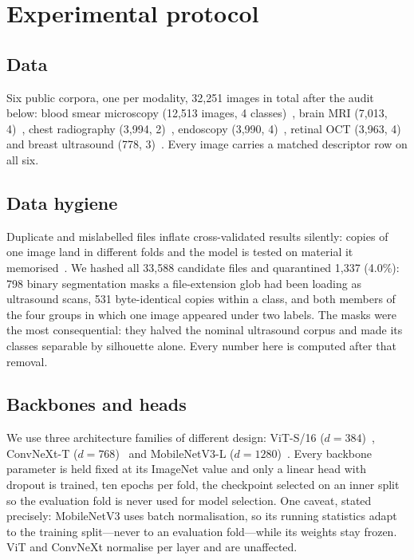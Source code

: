\documentclass[conference]{IEEEtran}
\begin{document}
\section{Experimental protocol}

\subsection{Data}
Six public corpora, one per modality, 32{,}251 images in total after the audit
below: blood smear microscopy (12{,}513 images, 4
classes)~\cite{mooney2018blood}, brain MRI (7{,}013, 4)~\cite{nickparvar2021brain},
chest radiography (3{,}994, 2)~\cite{kermany2018identifying}, endoscopy (3{,}990,
4)~\cite{heartzhacker2023medical}, retinal OCT (3{,}963,
4)~\cite{kermany2018identifying} and breast ultrasound
(778, 3)~\cite{aldhabyani2020dataset}. Every image carries a matched descriptor
row on all six.

\subsection{Data hygiene}
\label{sec:hygiene}
Duplicate and mislabelled files inflate cross-validated results silently: copies
of one image land in different folds and the model is tested on material it
memorised~\cite{barz2020purging}. We hashed all 33{,}588 candidate files and
quarantined 1{,}337 (4.0\%): 798 binary segmentation masks a file-extension glob
had been loading as ultrasound scans, 531 byte-identical copies within a class,
and both members of the four groups in which one image appeared under two labels. The masks were the most consequential: they halved the
nominal ultrasound corpus and made its classes separable by silhouette alone. Every
number here is computed after that removal.

\subsection{Backbones and heads}
We use three architecture families of different design: ViT-S/16 ($d=384$)~\cite{dosovitskiy2020image},
ConvNeXt-T ($d=768$)~\cite{liu2022convnet} and MobileNetV3-L ($d=1280$)~\cite{howard2019searching}.
Every backbone parameter is held fixed at its ImageNet value and only a linear
head with dropout is trained, ten epochs per fold, the checkpoint selected on an
inner split so the evaluation fold is never used for model selection. One caveat,
stated precisely: MobileNetV3 uses batch normalisation, so its running statistics
adapt to the training split---never to an evaluation fold---while its weights stay
frozen. ViT and ConvNeXt normalise per layer and are unaffected.
\end{document}
